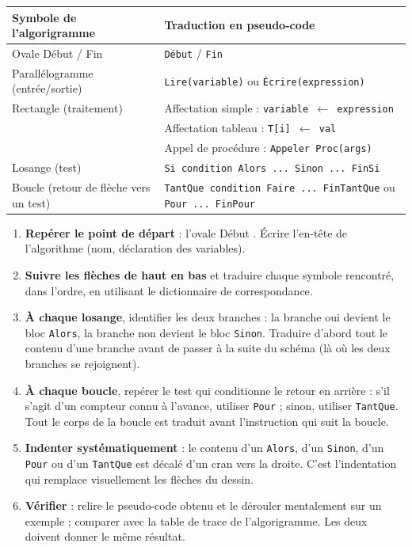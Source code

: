 \documentclass[11pt]{article}
\begin{document}
\begin{center}
\begin{tabularx}{\linewidth}{|l|X|}
\hline
\rowcolor{popblueL} \textbf{Symbole de l'algorigramme} & \textbf{Traduction en pseudo-code} \\
\hline
Ovale Début / Fin & \texttt{Début} / \texttt{Fin} \\
\hline
Parallélogramme (entrée/sortie) & \texttt{Lire(variable)} ou \texttt{Écrire(expression)} \\
\hline
Rectangle (traitement) & Affectation simple : \texttt{variable $\leftarrow$ expression} \\
& Affectation tableau : \texttt{T[i] $\leftarrow$ val} \\
& Appel de procédure : \texttt{Appeler Proc(args)} \\
\hline
Losange (test) & \texttt{Si condition Alors ... Sinon ... FinSi} \\
\hline
Boucle (retour de flèche vers un test) & \texttt{TantQue condition Faire ... FinTantQue} ou \texttt{Pour ... FinPour} \\
\hline
\end{tabularx}
\end{center}

\begin{methode}
\begin{enumerate}
\item \textbf{Repérer le point de départ} : l'ovale \og Début \fg. Écrire l'en-tête de l'algorithme (nom, déclaration des variables).
\item \textbf{Suivre les flèches de haut en bas} et traduire chaque symbole rencontré, dans l'ordre, en utilisant le dictionnaire de correspondance.
\item \textbf{À chaque losange}, identifier les deux branches : la branche \og oui \fg devient le bloc \texttt{Alors}, la branche \og non \fg devient le bloc \texttt{Sinon}. Traduire d'abord tout le contenu d'une branche avant de passer à la suite du schéma (là où les deux branches se rejoignent).
\item \textbf{À chaque boucle}, repérer le test qui conditionne le retour en arrière : s'il s'agit d'un compteur connu à l'avance, utiliser \texttt{Pour} ; sinon, utiliser \texttt{TantQue}. Tout le corps de la boucle est traduit avant l'instruction qui suit la boucle.
\item \textbf{Indenter systématiquement} : le contenu d'un \texttt{Alors}, d'un \texttt{Sinon}, d'un \texttt{Pour} ou d'un \texttt{TantQue} est décalé d'un cran vers la droite. C'est l'indentation qui remplace visuellement les flèches du dessin.
\item \textbf{Vérifier} : relire le pseudo-code obtenu et le dérouler mentalement sur un exemple ; comparer avec la table de trace de l'algorigramme. Les deux doivent donner le même résultat.
\end{enumerate}
\end{methode}
\end{document}
